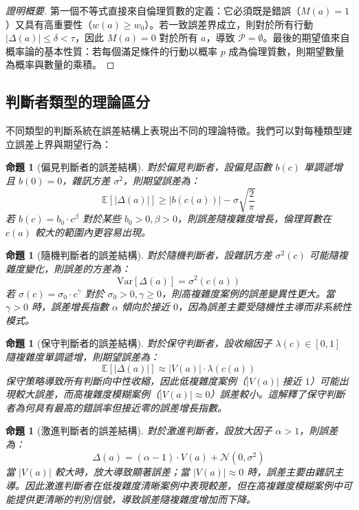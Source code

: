\documentclass[12pt,a4paper]{article}
\newtheorem{proposition}[theorem]{命題}
\theoremstyle{definition}
\theoremstyle{remark}
\begin{document}
\begin{proof}[證明概要]
第一個不等式直接來自倫理質數的定義：它必須既是錯誤（$M(a) = 1$）又具有高重要性（$w(a) \geq w_0$）。若一致誤差界成立，則對於所有行動 $|\Delta(a)| \leq \delta < \tau$，因此 $M(a) = 0$ 對於所有 $a$，導致 $\mathcal{P} = \emptyset$。最後的期望值來自概率論的基本性質：若每個滿足條件的行動以概率 $p$ 成為倫理質數，則期望數量為概率與數量的乘積。
\end{proof}

\subsection{判斷者類型的理論區分}

不同類型的判斷系統在誤差結構上表現出不同的理論特徵。我們可以對每種類型建立誤差上界與期望行為：

\begin{proposition}[偏見判斷者的誤差結構]
\label{prop:biased_error}
對於偏見判斷者，設偏見函數 $b(c)$ 單調遞增且 $b(0) = 0$，雜訊方差 $\sigma^2$，則期望誤差為：
\[
\mathbb{E}[|\Delta(a)|] \geq |b(c(a))| - \sigma \sqrt{\frac{2}{\pi}}
\]
若 $b(c) = b_0 \cdot c^\beta$ 對於某些 $b_0 > 0, \beta > 0$，則誤差隨複雜度增長，倫理質數在 $c(a)$ 較大的範圍內更容易出現。
\end{proposition}

\begin{proposition}[隨機判斷者的誤差結構]
\label{prop:noisy_error}
對於隨機判斷者，設雜訊方差 $\sigma^2(c)$ 可能隨複雜度變化，則誤差的方差為：
\[
\text{Var}[\Delta(a)] = \sigma^2(c(a))
\]
若 $\sigma(c) = \sigma_0 \cdot c^\gamma$ 對於 $\sigma_0 > 0, \gamma \geq 0$，則高複雜度案例的誤差變異性更大。當 $\gamma > 0$ 時，誤差增長指數 $\alpha$ 傾向於接近 $0$，因為誤差主要受隨機性主導而非系統性模式。
\end{proposition}

\begin{proposition}[保守判斷者的誤差結構]
\label{prop:conservative_error}
對於保守判斷者，設收縮因子 $\lambda(c) \in [0,1]$ 隨複雜度單調遞增，則期望誤差為：
\[
\mathbb{E}[|\Delta(a)|] \approx |V(a)| \cdot \lambda(c(a))
\]
保守策略導致所有判斷向中性收縮，因此低複雜度案例（$|V(a)|$ 接近 $1$）可能出現較大誤差，而高複雜度模糊案例（$|V(a)| \approx 0$）誤差較小。這解釋了保守判斷者為何具有最高的錯誤率但接近零的誤差增長指數。
\end{proposition}

\begin{proposition}[激進判斷者的誤差結構]
\label{prop:radical_error}
對於激進判斷者，設放大因子 $\alpha > 1$，則誤差為：
\[
\Delta(a) = (\alpha - 1) \cdot V(a) + \mathcal{N}(0, \sigma^2)
\]
當 $|V(a)|$ 較大時，放大導致顯著誤差；當 $|V(a)| \approx 0$ 時，誤差主要由雜訊主導。因此激進判斷者在低複雜度清晰案例中表現較差，但在高複雜度模糊案例中可能提供更清晰的判別信號，導致誤差隨複雜度增加而下降。
\end{proposition}
\end{document}
